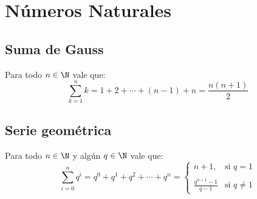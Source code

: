 \documentclass[../main.tex]{subfiles}
\begin{document}
\section{Números Naturales} {
    \subsection{Suma de Gauss} {
        Para todo $n \in \N$ vale que:
        \begin{equation*}
           \sum_{k=1}^n {k} =  1 + 2 + \cdots + (n-1) + n = \frac{n(n+1)}{2}
        \end{equation*}
    } \label{suma_gauss}
    
    \subsection{Serie geométrica} {
        Para todo $n \in \N$ y algún $q \in \N$ vale que:
        \begin{equation*}
            \sum_{i=0}^n {q^i} = q^0 + q^1 + q^2 + \cdots + q^n =
            \left\{
                \begin{array}{lr}
                    n+1, & \text{si } q = 1 \\\\
                    \frac{q^{n+1}-1}{q-1} & \text{si } q \neq 1
                \end{array}
            \right.
        \end{equation*}
    } \label{serie_geometrica}
    
    
}
\newpage
\end{document}
